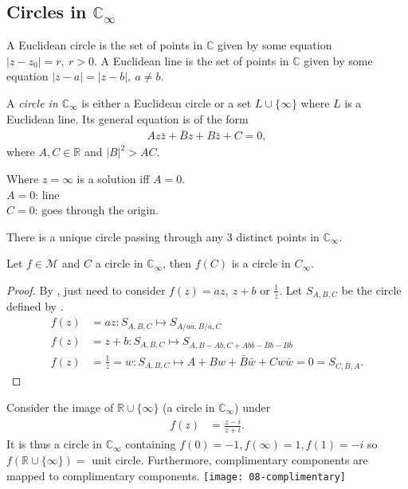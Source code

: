 \subsection{Circles in $\mathbb{C}_\infty$}

A Euclidean circle is the set of points in $\mathbb{C}$ given by some equation $|z - z_0| = r,\ r > 0$.
A Euclidean line is the set of points in $\mathbb{C}$ given by some equation $|z - a| = |z - b|,\ a \neq b$.

\begin{definition}
    A \emph{circle in $\mathbb{C}_\infty$} is either a Euclidean circle or a set $L \cup \{\infty\}$ where $L$ is a Euclidean line.
    Its general equation is of the form 
    \begin{align}
        Az\bar z + \bar Bz + B\bar z + C = 0, \label{eq:circle}
    \end{align} 
    where $A, C \in \mathbb{R}$ and $|B|^2 > AC$.
\end{definition}

Where $z = \infty$ is a solution iff $A = 0$. \\
$A = 0$: line \\
$C = 0$: goes through the origin.

There is a unique circle passing through any 3 distinct points in $\mathbb{C}_\infty$.

\begin{theorem} \label{thm:18}
    Let $f \in \mathcal{M}$ and $C$ a circle in $\mathbb{C}_\infty$, then $f(C)$ is a circle in $C_\infty$.
\end{theorem} 

\begin{proof}
    By , just need to consider 
    $f(z) = az,\ z + b \text{ or } \frac{1}{z}.$
    Let $S_{A, B, C}$ be the circle defined by .
    \begin{align*}
        f(z) &= az : S_{A, B, C} \mapsto S_{A / a \bar{a}, B / \bar{a}, C} \\
        f(z) &= z + b: S_{A, B, C} \mapsto S_{A, B - Ab, C + A b \bar{b} - \bar{B}b - B \bar{b}} \\
        f(z) &= \frac{1}{z} = w: S_{A, B, C} \mapsto A + B w + \bar{B} \bar{w} + C w \bar{w} = 0 = S_{C, \bar{B}, A}.
    \end{align*} 
\end{proof} 

\begin{example}
    Consider the image of $\mathbb{R} \cup \{\infty\}$ (a circle in $\mathbb{C}_\infty$) under 
    \begin{align*}
        f(z) &= \frac{z - i}{z + i}.
    \end{align*}
    It is thus a circle in $\mathbb{C}_\infty$ containing $f(0) = -1, f(\infty) = 1, f(1) = -i$ so $f(\mathbb{R} \cup \{\infty\}) = $ unit circle. 
    Furthermore, complimentary components are mapped to complimentary components.
    {\centering \texttt{[image: 08-complimentary]}}
\end{example} 

